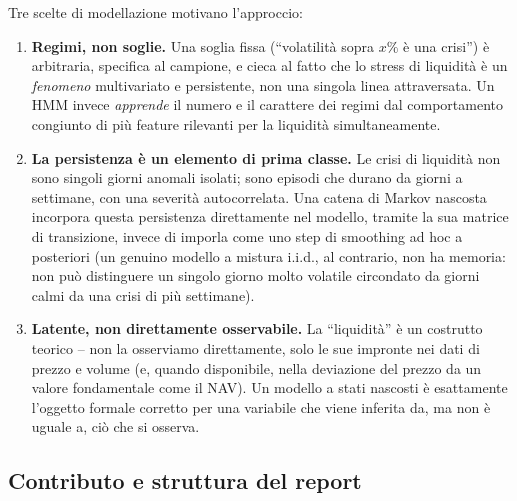 \documentclass[11pt]{article}
\theoremstyle{definition}
\theoremstyle{remark}
\begin{document}
Tre scelte di modellazione motivano l'approccio:
\begin{enumerate}
    \item \textbf{Regimi, non soglie.} Una soglia fissa (``volatilit\`a sopra $x\%$ \`e una crisi'') \`e arbitraria, specifica al campione, e cieca al fatto che lo stress di liquidit\`a \`e un \emph{fenomeno} multivariato e persistente, non una singola linea attraversata. Un HMM invece \emph{apprende} il numero e il carattere dei regimi dal comportamento congiunto di pi\`u feature rilevanti per la liquidit\`a simultaneamente.
    \item \textbf{La persistenza \`e un elemento di prima classe.} Le crisi di liquidit\`a non sono singoli giorni anomali isolati; sono episodi che durano da giorni a settimane, con una severit\`a autocorrelata. Una catena di Markov nascosta incorpora questa persistenza direttamente nel modello, tramite la sua matrice di transizione, invece di imporla come uno step di smoothing ad hoc a posteriori (un genuino modello a mistura i.i.d., al contrario, non ha memoria: non pu\`o distinguere un singolo giorno molto volatile circondato da giorni calmi da una crisi di pi\`u settimane).
    \item \textbf{Latente, non direttamente osservabile.} La ``liquidit\`a'' \`e un costrutto teorico -- non la osserviamo direttamente, solo le sue impronte nei dati di prezzo e volume (e, quando disponibile, nella deviazione del prezzo da un valore fondamentale come il NAV). Un modello a stati nascosti \`e esattamente l'oggetto formale corretto per una variabile che viene inferita da, ma non \`e uguale a, ci\`o che si osserva.
\end{enumerate}

\subsection{Contributo e struttura del report}
\end{document}
